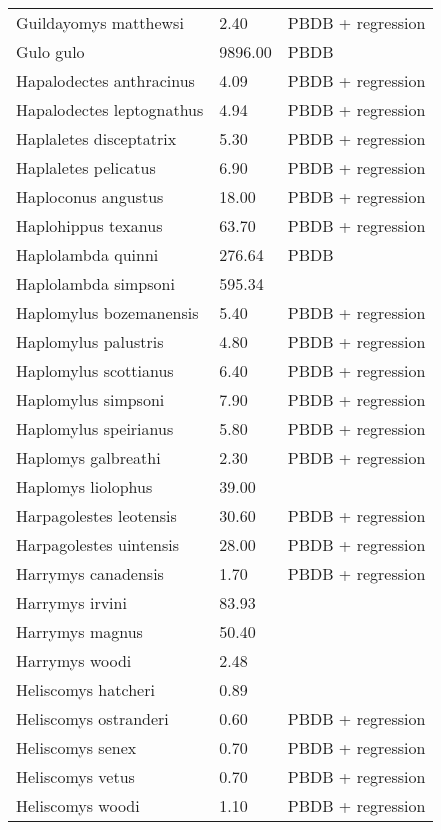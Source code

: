 \begin{longtable}{p{} p{} p{}}
    Guildayomys matthewsi & 2.40 & PBDB + regression \\ 
    Gulo gulo & 9896.00 & PBDB \\ 
    Hapalodectes anthracinus & 4.09 & PBDB + regression \\ 
    Hapalodectes leptognathus & 4.94 & PBDB + regression \\ 
    Haplaletes disceptatrix & 5.30 & PBDB + regression \\ 
    Haplaletes pelicatus & 6.90 & PBDB + regression \\ 
    Haploconus angustus & 18.00 & PBDB + regression \\ 
    Haplohippus texanus & 63.70 & PBDB + regression \\ 
    Haplolambda quinni & 276.64 & PBDB \\ 
    Haplolambda simpsoni & 595.34 & \cite{Tedford1994} \\ 
    Haplomylus bozemanensis & 5.40 & PBDB + regression \\ 
    Haplomylus palustris & 4.80 & PBDB + regression \\ 
    Haplomylus scottianus & 6.40 & PBDB + regression \\ 
    Haplomylus simpsoni & 7.90 & PBDB + regression \\ 
    Haplomylus speirianus & 5.80 & PBDB + regression \\ 
    Haplomys galbreathi & 2.30 & PBDB + regression \\ 
    Haplomys liolophus & 39.00 & \cite{McKenna2011} \\ 
    Harpagolestes leotensis & 30.60 & PBDB + regression \\ 
    Harpagolestes uintensis & 28.00 & PBDB + regression \\ 
    Harrymys canadensis & 1.70 & PBDB + regression \\ 
    Harrymys irvini & 83.93 & \cite{Tomiya2013} \\ 
    Harrymys magnus & 50.40 & \cite{Tomiya2013} \\ 
    Harrymys woodi & 2.48 & \cite{Kirk2011} \\ 
    Heliscomys hatcheri & 0.89 & \cite{Wilson2012} \\ 
    Heliscomys ostranderi & 0.60 & PBDB + regression \\ 
    Heliscomys senex & 0.70 & PBDB + regression \\ 
    Heliscomys vetus & 0.70 & PBDB + regression \\ 
    Heliscomys woodi & 1.10 & PBDB + regression \\ 

\end{longtable}
